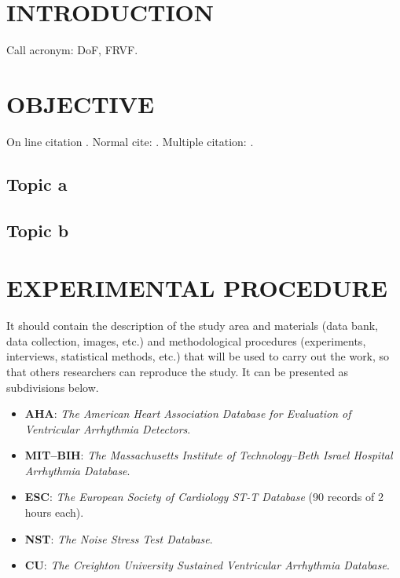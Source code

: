 \chapter{INTRODUCTION}
\label{chap:introduction}

Call acronym: \ac{DoF}, \ac{FRVF}.

\lipsum[1-2]

\chapter{OBJECTIVE}
\label{chap:objetive}

On line citation .
Normal cite: \cite{earnshaw2014virtual}. Multiple citation: \cite{azuma1997survey, earnshaw2014virtual}.

\section{Topic a}

\lipsum[1]

\section{Topic b}

\lipsum[1]

\chapter{EXPERIMENTAL PROCEDURE} 
\label{chap:methodology}

It should contain the description of the study area and materials (data bank, data collection, images, etc.) and methodological procedures (experiments, interviews, statistical methods, etc.) that will be used to carry out the work, so that others researchers can reproduce the study. It can be presented as subdivisions below.

\begin{itemize}
    \item \large \textbf{AHA}: \large \textit{The American Heart Association Database for Evaluation of Ventricular Arrhythmia Detectors}.
    \item \large \textbf{MIT–BIH}: \large \textit{The Massachusetts Institute of Technology–Beth Israel Hospital Arrhythmia Database}.
    \item \large \textbf{ESC}: \large \textit{The European Society of Cardiology ST-T Database} (90 records of 2 hours each).
    \item \large \textbf{NST}: \large \textit{The Noise Stress Test Database}.
    \item \large \textbf{CU}: \large \textit{The Creighton University Sustained Ventricular Arrhythmia Database}.
\end{itemize}

